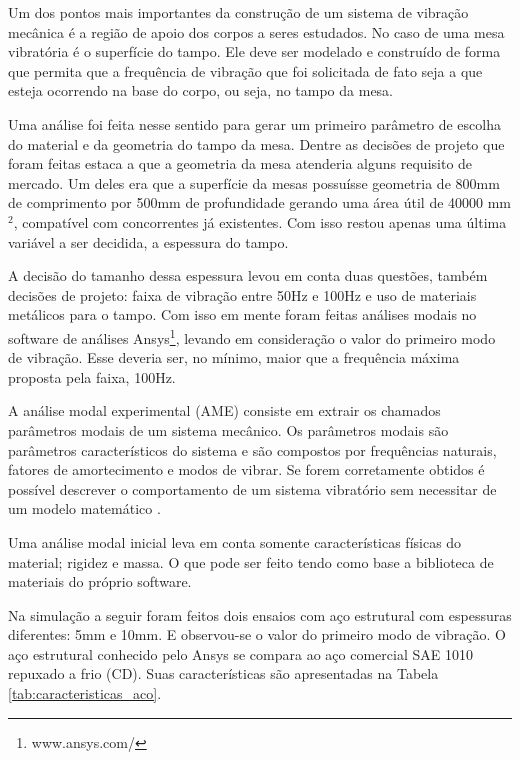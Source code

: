 
Um dos pontos mais importantes da construção de um sistema de vibração mecânica é a região de apoio dos corpos a seres estudados. No caso de uma
mesa vibratória é o superfície do tampo. Ele deve ser modelado e construído de forma que permita que a frequência de vibração que foi solicitada de 
fato seja a que esteja ocorrendo na base do corpo, ou seja, no tampo da mesa.

  Uma análise foi feita nesse sentido para gerar um primeiro parâmetro de escolha do material e da geometria do tampo da mesa. Dentre as decisões 
  de projeto que foram feitas estaca a que a geometria da mesa atenderia alguns requisito de mercado. Um deles era que a superfície da mesas possuísse
  geometria de 800mm de comprimento por 500mm de profundidade gerando uma área útil de 40000 mm$^2$, compatível com concorrentes já existentes. 
  Com isso restou apenas uma última variável a ser decidida, a espessura do tampo.

  A decisão do tamanho dessa espessura levou em conta duas questões, também decisões de projeto: faixa de vibração entre 50Hz e 100Hz e uso de 
  materiais metálicos para o tampo. Com isso em mente foram feitas análises modais no software de análises Ansys\footnote{www.ansys.com/}, levando
  em consideração o valor do primeiro modo de vibração. Esse deveria ser, no mínimo, maior que a frequência máxima proposta pela faixa, 100Hz.

  A análise modal experimental (AME) consiste em extrair os chamados parâmetros modais de um sistema mecânico. Os parâmetros modais são parâmetros 
  característicos do sistema e são compostos por frequências naturais, fatores de amortecimento e modos de vibrar. Se forem corretamente obtidos é
  possível descrever o comportamento de um sistema vibratório sem necessitar de um modelo matemático \cite{evandro}.

  Uma análise modal inicial leva em conta somente características físicas do material; rigidez e massa. O que pode ser feito tendo como base a 
  biblioteca de materiais do próprio software.

  Na simulação a seguir foram feitos dois ensaios com aço estrutural com espessuras diferentes: 5mm e 10mm. E observou-se o valor do primeiro modo 
  de vibração. O aço estrutural conhecido pelo Ansys se compara ao aço comercial SAE 1010 repuxado a frio (CD). Suas características são apresentadas 
  na Tabela \ref{tab:caracteristicas_aco}.

